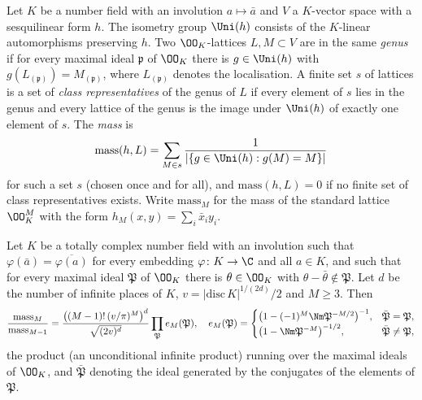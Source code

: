 Let $K$ be a number field with an involution $a\mapsto\bar a$ and $V$ a $K$-vector space with a sesquilinear form $h$. The
isometry group $\Uni(h)$ consists of the $K$-linear automorphisms preserving $h$. Two $\OO_K$-lattices $L,M\subset V$ are in the
same \emph{genus} if for every maximal ideal $\mathfrak p$ of $\OO_K$ there is $g\in\Uni(h)$ with $g(L_{(\mathfrak p)})=M_{(\mathfrak
p)}$, where $L_{(\mathfrak p)}$ denotes the localisation. A finite set $s$ of lattices is a set of \emph{class representatives} of
the genus of $L$ if every element of $s$ lies in the genus and every lattice of the genus is the image under $\Uni(h)$ of exactly one
element of $s$. The \emph{mass} is
\[
\mathrm{mass}(h,L)=\sum_{M\in s}\frac{1}{|\{g\in\Uni(h):g(M)=M\}|}
\]
for such a set $s$ (chosen once and for all), and $\mathrm{mass}(h,L)=0$ if no finite set of class representatives exists. Write
$\mathrm{mass}_M$ for the mass of the standard lattice $\OO_K^M$ with the form $h_M(x,y)=\sum_i\bar x_iy_i$.

\begin{proposition}\label{pf:bundles:prop:mass}
Let $K$ be a totally complex number field with an involution such that $\varphi(\bar a)=\overline{\varphi(a)}$ for every embedding
$\varphi\colon K\to\C$ and all $a\in K$, and such that for every maximal ideal $\mathfrak P$ of $\OO_K$ there is $\theta\in\OO_K$
with $\theta-\bar\theta\notin\mathfrak P$. Let $d$ be the number of infinite places of $K$, $v=|\mathrm{disc}\,K|^{1/(2d)}/2$ and
$M\ge3$. Then
\begin{equation}\label{pf:bundles:eq:mass}
\frac{\mathrm{mass}_M}{\mathrm{mass}_{M-1}}=\frac{\bigl((M-1)!\,(v/\pi)^M\bigr)^{d}}{\sqrt{(2v)^{d}}}
\prod_{\mathfrak P}e_M(\mathfrak P),\quad
e_M(\mathfrak P)=\begin{cases}\bigl(1-(-1)^M\Nm\mathfrak P^{-M/2}\bigr)^{-1},&\bar{\mathfrak P}=\mathfrak P,\\
\bigl(1-\Nm\mathfrak P^{-M}\bigr)^{-1/2},&\bar{\mathfrak P}\ne\mathfrak P,\end{cases}
\end{equation}
the product (an unconditional infinite product) running over the maximal ideals of $\OO_K$, and $\bar{\mathfrak P}$ denoting the
ideal generated by the conjugates of the elements of $\mathfrak P$.
\end{proposition}

